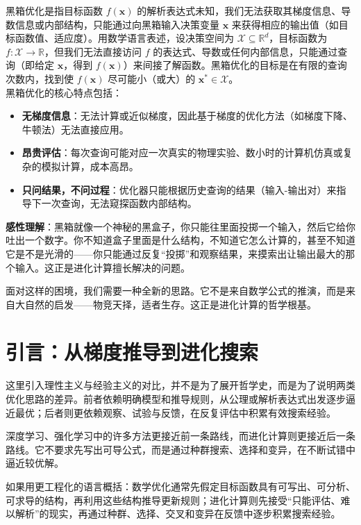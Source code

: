 \documentclass[lang=cn,zihao=-4,a4paper,fontset=windows]{beautybook}
\begin{document}
\begin{definition}
黑箱优化是指目标函数 \(f(\mathbf{x})\) 的解析表达式未知，我们无法获取其梯度信息、导数信息或内部结构，只能通过向黑箱输入决策变量 \(\mathbf{x}\) 来获得相应的输出值（如目标函数值、适应度）。用数学语言表述，设决策空间为 \(\mathcal{X} \subseteq \mathbb{R}^d\)，目标函数为 \(f: \mathcal{X} \to \mathbb{R}\)，但我们无法直接访问 \(f\) 的表达式、导数或任何内部信息，只能通过查询（即给定 \(\mathbf{x}\)，得到 \(f(\mathbf{x})\)）来间接了解函数。黑箱优化的目标是在有限的查询次数内，找到使 \(f(\mathbf{x})\) 尽可能小（或大）的 \(\mathbf{x}^* \in \mathcal{X}\)。\\
黑箱优化的核心特点包括：
\begin{itemize}
    \item \textbf{无梯度信息}：无法计算或近似梯度，因此基于梯度的优化方法（如梯度下降、牛顿法）无法直接应用。
    \item \textbf{昂贵评估}：每次查询可能对应一次真实的物理实验、数小时的计算机仿真或复杂的模拟计算，成本高昂。
    \item \textbf{只问结果，不问过程}：优化器只能根据历史查询的结果（输入-输出对）来指导下一次查询，无法窥探函数内部结构。
\end{itemize}
\textbf{感性理解}：黑箱就像一个神秘的黑盒子，你只能往里面投掷一个输入，然后它给你吐出一个数字。你不知道盒子里面是什么结构，不知道它怎么计算的，甚至不知道它是不是光滑的——你只能通过反复“投掷”和观察结果，来摸索出让输出最大的那个输入。这正是进化计算擅长解决的问题。
\end{definition}

面对这样的困境，我们需要一种全新的思路。它不是来自数学公式的推演，而是来自大自然的启发——物竞天择，适者生存。这正是进化计算的哲学根基。

\section{引言：从梯度推导到进化搜索}

这里引入理性主义与经验主义的对比，并不是为了展开哲学史，而是为了说明两类优化思路的差异。前者依赖明确模型和推导规则，从公理或解析表达式出发逐步逼近最优；后者则更依赖观察、试验与反馈，在反复评估中积累有效搜索经验。

深度学习、强化学习中的许多方法更接近前一条路线，而进化计算则更接近后一条路线。它不要求先写出可导公式，而是通过种群搜索、选择和变异，在不断试错中逼近较优解。

如果用更工程化的语言概括：数学优化通常先假定目标函数具有可写出、可分析、可求导的结构，再利用这些结构推导更新规则；进化计算则先接受“只能评估、难以解析”的现实，再通过种群、选择、交叉和变异在反馈中逐步积累搜索经验。
\end{document}
